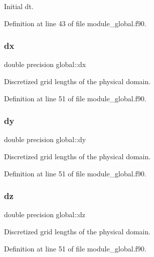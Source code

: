 Initial dt. 



Definition at line 43 of file module\+\_\+global.\+f90.

\mbox{\label{namespaceglobal_a9c5f8c3cf5f9b496608059fc13776b4c}} 
\subsubsection{\texorpdfstring{dx}{dx}}
{\footnotesize\ttfamily double precision global\+::dx}



Discretized grid lengths of the physical domain. 



Definition at line 51 of file module\+\_\+global.\+f90.

\mbox{\label{namespaceglobal_aa2d01c0b9c06af88ae13136658fc3dd9}} 
\subsubsection{\texorpdfstring{dy}{dy}}
{\footnotesize\ttfamily double precision global\+::dy}



Discretized grid lengths of the physical domain. 



Definition at line 51 of file module\+\_\+global.\+f90.

\mbox{\label{namespaceglobal_a4015487c561985eefa8cabc39f591540}} 
\subsubsection{\texorpdfstring{dz}{dz}}
{\footnotesize\ttfamily double precision global\+::dz}



Discretized grid lengths of the physical domain. 



Definition at line 51 of file module\+\_\+global.\+f90.

\mbox{\label{namespaceglobal_ac5d2ea39fc192fbb8354e665dc91b759}} 
